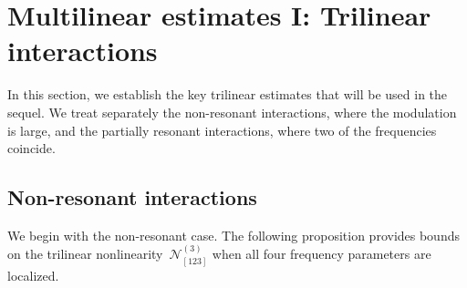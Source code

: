 \documentclass[11pt,reqno,english]{amsart}
\numberwithin{equation}{section}
\theoremstyle{plain}
\theoremstyle{definition}
\theoremstyle{remark}
\begin{document}
	
	\section{Multilinear estimates I: Trilinear interactions}\label{sec:trilinear}

In this section, we establish the key trilinear estimates that will be used in the sequel. We treat separately the non-resonant interactions, where the modulation is large, and the partially resonant interactions, where two of the frequencies coincide.

\subsection{Non-resonant interactions}

We begin with the non-resonant case. The following proposition provides bounds on the trilinear nonlinearity~$\mathcal{N}_{[123]}^{(3)}$ when all four frequency parameters are localized.
\end{document}

